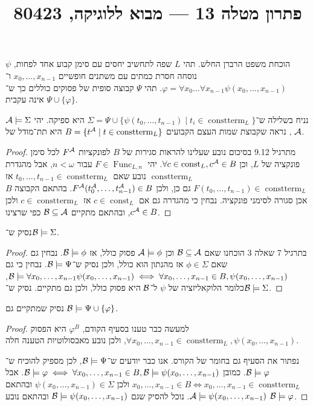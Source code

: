 
\title{פתרון מטלה 13 --- מבוא ללוגיקה, 80423}


\maketitle
\maketitleprint{}

\question{}
הוכחת משפט הרברן החלש.
תהי $L$ שפה לתחשיב יחסים עם סימן קבוע אחד לפחות, $\psi$ נוסחה חסרת כמתים עם משתנים חופשיים $x_0, \dots, x_{n - 1}$ ו־$\varphi = \forall x_0 \dots \forall x_{n - 1} \psi(x_0, \dots, x_{n - 1})$.
תהי $\Psi$ קבוצה סופית של פסוקים כוללים כך ש־$\Psi \cup \{ \varphi \}$ אינה עקבית.

\subquestion{}
נניח בשלילה ש־$\Sigma = \Psi \cup \{ \psi(t_0, \dots, t_{n - 1}) \mid t_i \in \operatorname{constterm}_L \}$ היא ספיקה.
יהי $\mathcal{A} \models \Sigma$,
נראה שקבוצת שמות העצם הקבועים $B = \{ t^{\mathcal{A}} \mid t \in \operatorname{constterm}_L \}$ היא תת־מודל של $\mathcal{A}$.
\begin{proof}
	מתרגיל 9.12 בסיכום נובע שעלינו להראות סגירות של $B$ לפונקציות $F^{\mathcal{A}}$ לכל סימן פונקציה של $L$, וכן $\forall c \in \operatorname{const}_L, c^{\mathcal{A}} \in B$.
	יהי $F \in \operatorname{Func}_{L, n}$ עבור $n < \omega$,
	אבל מהגדרת $\operatorname{constterm}_L$ נובע שאם $t_0, \dots, t_{n - 1} \in \operatorname{constterm}_L$ אז $F(t_0, \dots, t_{n - 1}) \in \operatorname{constterm}_L$ גם כן, ולכן $F^{\mathcal{A}}(t_0^{\mathcal{A}}, \dots, t_{n - 1}^{\mathcal{A}}) \in B$.
	בהתאם הקבוצה $B$ אכן סגורה לסימני פונקציה.
	נבחין כי מהגדרה גם אם $c \in \operatorname{const}_L$ אז $c \in \operatorname{constterm}_L$ ולכן $c^{\mathcal{A}} \in B$, ובהתאם מתקיים $\mathcal{B} \subseteq \mathcal{A}$ כפי שרצינו.
\end{proof}

\subquestion{}
נסיק ש־$\mathcal{B} \models \Sigma$.
\begin{proof}
	בתרגיל 7 שאלה 3 הוכחנו שאם $\mathcal{B} \subseteq \mathcal{A}$ וכן $\mathcal{A} \models \phi$ פסוק כולל, אז $\mathcal{B} \models \phi$.
	נבחין גם שאם $\phi \in \Sigma$ אז מהנתון הוא כולל, ולכן נסיק ש־$\mathcal{B} \models \Psi$.
	נבחין כי גם $\mathcal{B} \models \forall x_0, \dots, x_{n - 1} \psi(x_0, \dots, x_{n - 1}) \iff \forall x_0, \dots, x_{n - 1} \in B, \psi(x_0, \dots, x_{n - 1})$, כלומר הלוקאליזציה של $\psi$ ל־$\mathcal{B}$ היא פסוק כולל, ולכן גם מתקיים.
	נסיק ש־$\mathcal{B} \models \Sigma$.
\end{proof}

\subquestion{}
נסיק שמתקיים גם $\mathcal{B} \models \Psi \cup \{ \varphi \}$.
\begin{proof}
	למעשה כבר טענו בסעיף הקודם, $\varphi^B$ היא הפסוק $\forall x_0, \dots, x_{n - 1} \in \operatorname{constterm}_L, \psi(x_0, \dots, x_{n - 1})$, ולכן נובע מאבסולוטיות הטענה חלה.

	נפתור את הסעיף גם בחומר של הקורס.
	אנו כבר יודעים ש־$\mathcal{B} \models \Psi$, לכן מספיק להוכיח ש־$\mathcal{B} \models \varphi$.
	כמובן $\mathcal{B} \models \varphi \iff \forall x_0, \dots, x_{n - 1} \in B, \mathcal{B} \models \psi(x_0, \dots, x_{n - 1})$.
	אבל $x_0, \dots, x_{n - 1} \in B \iff x_0, \dots, x_{n - 1} \in \operatorname{constterm}_L$ ולכן $\psi(x_0, \dots, x_{n - 1}) \in \Sigma$ ובהתאם $\mathcal{A} \models \psi(x_0, \dots, x_{n - 1})$.
	נוכל להסיק שגם $\mathcal{B} \models \psi(x_0, \dots, x_{n - 1})$ ובהתאם נובע $\mathcal{B} \models \varphi$.
\end{proof}

